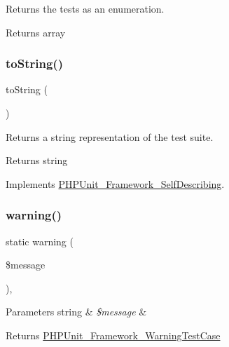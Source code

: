 Returns the tests as an enumeration.

\begin{DoxyReturn}{Returns}
array 
\end{DoxyReturn}
\mbox{\label{class_p_h_p_unit___framework___test_suite_a5558c5d549f41597377fa1ea8a1cefa3}} 
\subsubsection{\texorpdfstring{to\+String()}{toString()}}
{\footnotesize\ttfamily to\+String (\begin{DoxyParamCaption}{ }\end{DoxyParamCaption})}

Returns a string representation of the test suite.

\begin{DoxyReturn}{Returns}
string 
\end{DoxyReturn}


Implements \mbox{\hyperlink{interface_p_h_p_unit___framework___self_describing_a5558c5d549f41597377fa1ea8a1cefa3}{P\+H\+P\+Unit\+\_\+\+Framework\+\_\+\+Self\+Describing}}.

\mbox{\label{class_p_h_p_unit___framework___test_suite_a72294fb153640124f6c5ce9fc4d59e1b}} 
\subsubsection{\texorpdfstring{warning()}{warning()}}
{\footnotesize\ttfamily static warning (\begin{DoxyParamCaption}\item[{}]{\$message }\end{DoxyParamCaption})\hspace{0.3cm}{\ttfamily [static]}, {\ttfamily [protected]}}


\begin{DoxyParams}[1]{Parameters}
string & {\em \$message} & \\
\hline
\end{DoxyParams}
\begin{DoxyReturn}{Returns}
\mbox{\hyperlink{class_p_h_p_unit___framework___warning_test_case}{P\+H\+P\+Unit\+\_\+\+Framework\+\_\+\+Warning\+Test\+Case}} 
\end{DoxyReturn}


